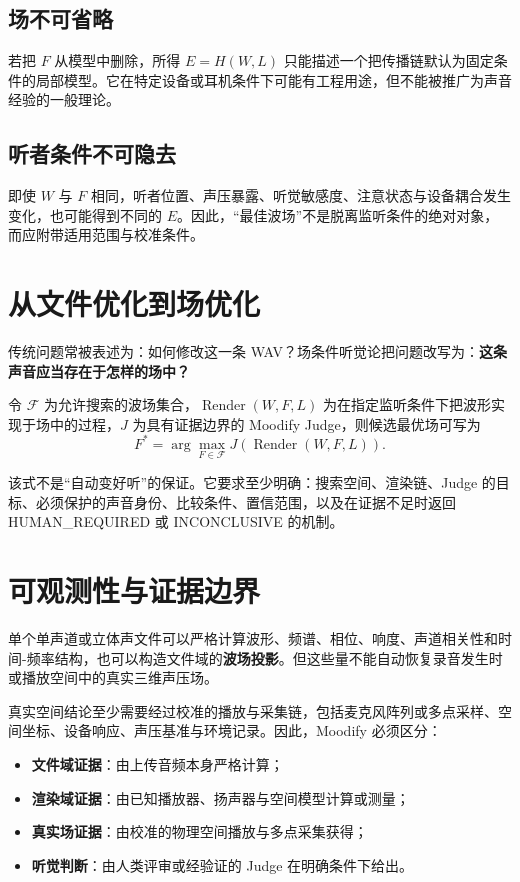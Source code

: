 \documentclass[10pt,a4paper]{article}
\newcommand{\term}[1]{\textbf{#1}}
\begin{document}
\subsection{场不可省略}
若把 $F$ 从模型中删除，所得 $E=H(W,L)$ 只能描述一个把传播链默认为固定条件的局部模型。它在特定设备或耳机条件下可能有工程用途，但不能被推广为声音经验的一般理论。

\subsection{听者条件不可隐去}
即使 $W$ 与 $F$ 相同，听者位置、声压暴露、听觉敏感度、注意状态与设备耦合发生变化，也可能得到不同的 $E$。因此，“最佳波场”不是脱离监听条件的绝对对象，而应附带适用范围与校准条件。

\section{从文件优化到场优化}
传统问题常被表述为：如何修改这一条 WAV？场条件听觉论把问题改写为：\term{这条声音应当存在于怎样的场中？}

令 $\mathcal{F}$ 为允许搜索的波场集合，$\operatorname{Render}(W,F,L)$ 为在指定监听条件下把波形实现于场中的过程，$J$ 为具有证据边界的 Moodify Judge，则候选最优场可写为
\begin{equation}
F^{*}=\arg\max_{F\in\mathcal{F}}J\!\left(\operatorname{Render}(W,F,L)\right).
\end{equation}

该式不是“自动变好听”的保证。它要求至少明确：搜索空间、渲染链、Judge 的目标、必须保护的声音身份、比较条件、置信范围，以及在证据不足时返回 HUMAN\_REQUIRED 或 INCONCLUSIVE 的机制。

\section{可观测性与证据边界}
单个单声道或立体声文件可以严格计算波形、频谱、相位、响度、声道相关性和时间-频率结构，也可以构造文件域的\term{波场投影}。但这些量不能自动恢复录音发生时或播放空间中的真实三维声压场。

真实空间结论至少需要经过校准的播放与采集链，包括麦克风阵列或多点采样、空间坐标、设备响应、声压基准与环境记录。因此，Moodify 必须区分：
\begin{itemize}
\item \textbf{文件域证据}：由上传音频本身严格计算；
\item \textbf{渲染域证据}：由已知播放器、扬声器与空间模型计算或测量；
\item \textbf{真实场证据}：由校准的物理空间播放与多点采集获得；
\item \textbf{听觉判断}：由人类评审或经验证的 Judge 在明确条件下给出。
\end{itemize}
\end{document}
